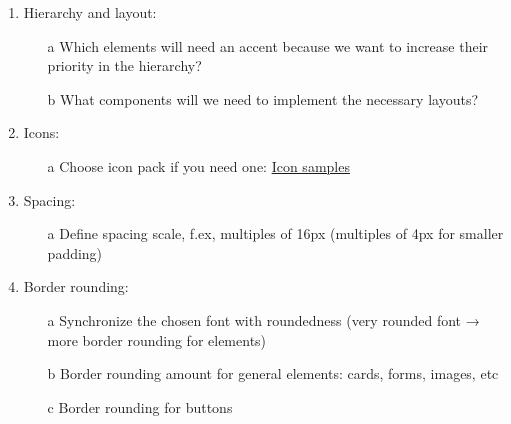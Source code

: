 \documentclass{article}
\begin{document}
\begin{enumerate}
\begin{enumerate}
    \end{enumerate}
    \item Hierarchy and layout:
    \begin{enumerate}
        \item[a] Which elements will need an accent because we want to increase their priority in the
hierarchy?
        \item[b] What components will we need to implement the necessary layouts?
    \end{enumerate}
    \item Icons:
    \begin{enumerate}
        \item[a] Choose icon pack if you need one: \href{https://phosphoricons.com/}{Icon samples}
    \end{enumerate}
    \item  Spacing:
        \begin{enumerate}
        \item[a] Define spacing scale, f.ex, multiples of 16px (multiples of 4px for smaller padding)
    \end{enumerate}
    \item  Border rounding:
        \begin{enumerate}
        \item[a] Synchronize the chosen font with roundedness (very rounded font → more border
rounding for elements)
        \item[b]  Border rounding amount for general elements: cards, forms, images, etc
        \item[c] Border rounding for buttons
    \end{enumerate}
\end{enumerate}
\end{document}
